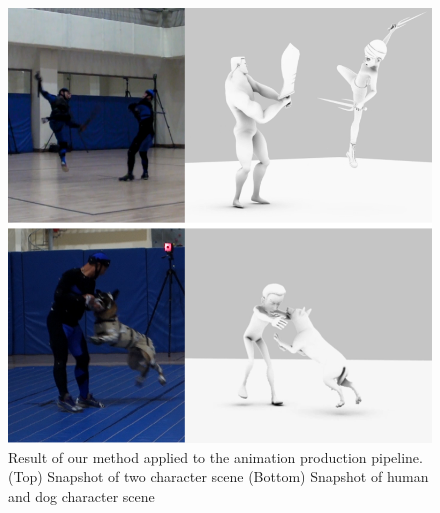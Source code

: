 \begin{figure}[!ht]
  \centering
  \includegraphics[width=1.0\linewidth]{images/production}
  \caption{Result of our method applied to the animation production pipeline. (Top) Snapshot of two character scene (Bottom) Snapshot of human and dog character scene}
  \label{fig:productionPipeline}
\end{figure}


%    

